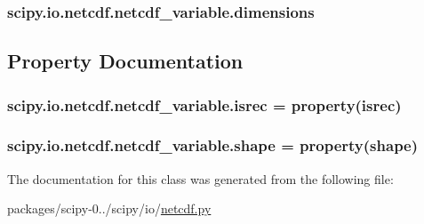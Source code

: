 \subsubsection[{dimensions}]{\setlength{\rightskip}{0pt plus 5cm}scipy.\+io.\+netcdf.\+netcdf\+\_\+variable.\+dimensions}\label{classscipy_1_1io_1_1netcdf_1_1netcdf__variable_a98ecf2e25172a515f13f3e8cdb9d1f55}


\subsection{Property Documentation}
\hypertarget{classscipy_1_1io_1_1netcdf_1_1netcdf__variable_aeff5d12ab64549605fbd15bd22489e2d}{}
\subsubsection[{isrec}]{\setlength{\rightskip}{0pt plus 5cm}scipy.\+io.\+netcdf.\+netcdf\+\_\+variable.\+isrec = property(isrec)\hspace{0.3cm}{\ttfamily [static]}}\label{classscipy_1_1io_1_1netcdf_1_1netcdf__variable_aeff5d12ab64549605fbd15bd22489e2d}
\hypertarget{classscipy_1_1io_1_1netcdf_1_1netcdf__variable_ada88b70101cf92620e9653eea8b0fa34}{}
\subsubsection[{shape}]{\setlength{\rightskip}{0pt plus 5cm}scipy.\+io.\+netcdf.\+netcdf\+\_\+variable.\+shape = property(shape)\hspace{0.3cm}{\ttfamily [static]}}\label{classscipy_1_1io_1_1netcdf_1_1netcdf__variable_ada88b70101cf92620e9653eea8b0fa34}


The documentation for this class was generated from the following file\+:\begin{DoxyCompactItemize}
\item 
packages/scipy-\/0../scipy/io/\hyperlink{netcdf_8py}{netcdf.\+py}\end{DoxyCompactItemize}
